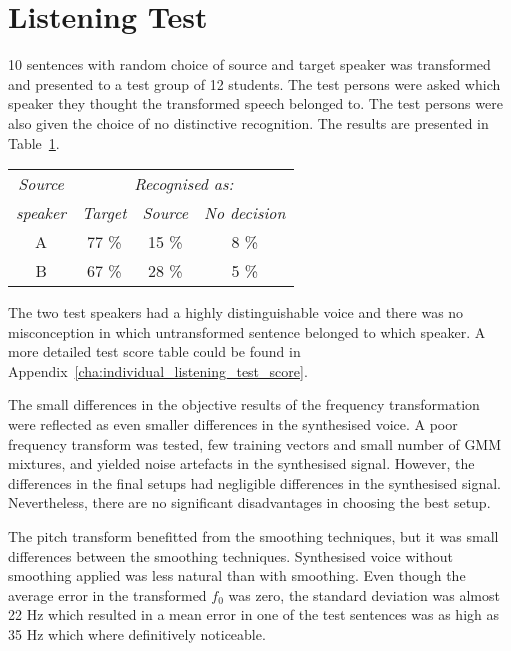 \section{Listening Test} %
\label{sec:listening_test}
10 sentences with random choice of source and target speaker was transformed and presented to a test group of 12 students. The test persons were asked which speaker they thought the transformed speech belonged to. The test persons were also given the choice of no distinctive recognition. The results are presented in Table~\ref{tab:subjective_listening_results}.
\begin{table}[htbp]
	\begin{center}
		\label{tab:subjective_listening_results}
		\begin{tabular}{c|ccc}
			\toprule
			\emph{Source} & \multicolumn{3}{c}{\emph{Recognised as:}}\\
			\emph{speaker} & \emph{Target} & \emph{Source} & \emph{No decision}\\
			\midrule
			A & 77 \% & 15 \% & 8 \% \\
			B & 67 \% & 28 \% & 5 \% \\
			\bottomrule			
		\end{tabular}		
	\end{center}	
\end{table}
The two test speakers had a highly distinguishable voice and there was no misconception in which untransformed sentence belonged to which speaker. A more detailed test score table could be found in Appendix~\ref{cha:individual_listening_test_score}.

The small differences in the objective results of the frequency transformation were reflected as even smaller differences in the synthesised voice. A poor frequency transform was tested, \ie few training vectors and small number of GMM mixtures, and yielded noise artefacts in the synthesised signal. However, the differences in the final setups had negligible differences in the synthesised signal. Nevertheless, there are no significant disadvantages in choosing the best setup.

The pitch transform benefitted from the smoothing techniques, but it was small differences between the smoothing techniques. Synthesised voice without smoothing applied was less natural than with smoothing. Even though the average error in the transformed $f_0$ was zero, the standard deviation was almost 22 Hz which resulted in a mean error in one of the test sentences was as high as 35 Hz which where definitively noticeable.

